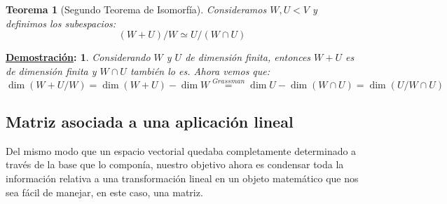 \documentclass[10pt,a4paper,openright]{book}
\theoremstyle{break}
\newtheorem*{theo}{Teorema}
\newtheorem*{demo}{\underline{Demostración}:}
\begin{document}
\begin{theo}[Segundo Teorema de Isomorfía]
Consideramos $W, U<V$ y definimos los subespacios:
$$(W+U)/W\simeq U/(W\cap U)$$
\end{theo}
\begin{demo}
Considerando $W$ y $U$ de dimensión finita, entonces $W+U$ es de dimensión finita y $W\cap U$ también lo es. Ahora vemos que:
$$\dim (W+U/W)=\dim (W+U)- \dim W\stackrel{Grassman}{=}\dim U-\dim (W\cap U)=\dim (U/W\cap U)$$
\end{demo}

\subsection{Matriz asociada a una aplicación lineal}
Del mismo modo que un espacio vectorial quedaba completamente determinado a través de la base que lo componía, nuestro objetivo ahora es condensar toda la información relativa a una transformación lineal en un objeto matemático que nos sea fácil de manejar, en este caso, una matriz.
\end{document}

